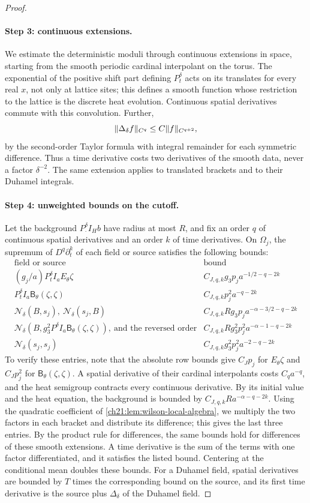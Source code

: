 \begin{proof}
\paragraph{Step 3: continuous extensions.}
We estimate the deterministic moduli through continuous extensions in space, starting from the smooth periodic cardinal interpolant on the torus. The exponential of the positive shift part defining $P_t^\delta$ acts on its translates for every real $x$, not only at lattice sites; this defines a smooth function whose restriction to the lattice is the discrete heat evolution. Continuous spatial derivatives commute with this convolution. Further,
\[
 \lVert \Delta_\delta f\rVert_{C^q}\le C\lVert f\rVert_{C^{q+2}},
\]
by the second-order Taylor formula with integral remainder for each symmetric difference. Thus a time derivative costs two derivatives of the smooth data, never a factor $\delta^{-2}$. The same extension applies to translated brackets and to their Duhamel integrals.

\paragraph{Step 4: unweighted bounds on the cutoff.}
Let the background $P_\cdot^\delta I_Hb$ have radius at most $R$, and fix an order $q$ of continuous spatial derivatives and an order $k$ of time derivatives. On $\Omega_j$, the supremum of $D^q\partial_t^k$ of each field or source satisfies the following bounds:
\[
 \begin{array}{l|l}
 \text{field or source}&\text{bound}\\ \hline
 (g_j/a)P_t^\delta I_aE_\theta\zeta&C_{J,q,k}g_3p_ja^{-1/2-q-2k}\\
 P_t^\delta I_a\mathsf B_\theta(\zeta,\zeta)&C_{J,q,k}p_j^2a^{-q-2k}\\
 \mathcal N_\delta(B,s_j),\ \mathcal N_\delta(s_j,B)&C_{J,q,k}Rg_3p_ja^{-\alpha-3/2-q-2k}\\
 \mathcal N_\delta(B,g_3^2P^\delta I_a\mathsf B_\theta(\zeta,\zeta)),\ \text{and the reversed order}&C_{J,q,k}Rg_3^2p_j^2a^{-\alpha-1-q-2k}\\
 \mathcal N_\delta(s_j,s_j)&C_{J,q,k}g_3^2p_j^2a^{-2-q-2k}
 \end{array}
\]
To verify these entries, note that the absolute row bounds give $C_Jp_j$ for $E_\theta\zeta$ and $C_Jp_j^2$ for $\mathsf B_\theta(\zeta,\zeta)$. A spatial derivative of their cardinal interpolants costs $C_qa^{-q}$, and the heat semigroup contracts every continuous derivative. By its initial value and the heat equation, the background is bounded by $C_{J,q,k}Ra^{-\alpha-q-2k}$. Using the quadratic coefficient of \cref{ch21:lem:wilson-local-algebra}, we multiply the two factors in each bracket and distribute its difference; this gives the last three entries. By the product rule for differences, the same bounds hold for differences of these smooth extensions. A time derivative is the sum of the terms with one factor differentiated, and it satisfies the listed bound. Centering at the conditional mean doubles these bounds. For a Duhamel field, spatial derivatives are bounded by $T$ times the corresponding bound on the source, and its first time derivative is the source plus $\Delta_\delta$ of the Duhamel field.


\end{proof}
